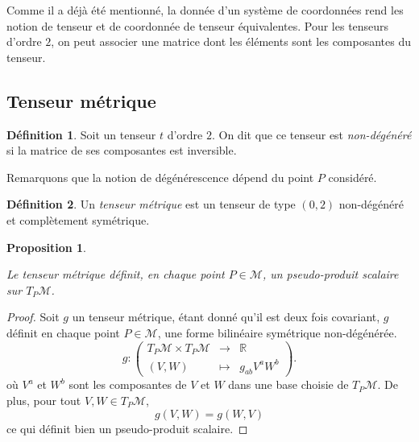 \documentclass[a4paper,11pt]{report}
\theoremstyle{definition}
\theoremstyle{plain}
\newtheorem{prop}[thm]{Proposition}
\theoremstyle{definition}
\newtheorem{defn}{Définition}[chapter]
\theoremstyle{remark}
\newcommand{\M}{\mathscr{M}}
\begin{document}
                Comme il a déjà été mentionné, la donnée d'un système de coordonnées rend les notion de tenseur et de coordonnée de tenseur équivalentes. Pour les tenseurs d'ordre $2$, on peut associer une matrice dont les éléments sont les composantes du tenseur.
                
            \subsection{Tenseur métrique}
                
                \begin{defn}
                    Soit un tenseur $t$ d'ordre $2$. On dit que ce tenseur est \textit{non-dégénéré} si la matrice de ses composantes est inversible.
                \end{defn}
                
                Remarquons que la notion de dégénérescence dépend du point $P$ considéré.
                
                \begin{defn}
                    Un \textit{tenseur métrique} est un tenseur de type $(0,2)$ non-dégénéré et complètement symétrique.
                \end{defn}
                
                \begin{prop}\begin{leftbar}
                    Le tenseur métrique définit, en chaque point $P\in\M$, un pseudo-produit scalaire sur $T_P\M$.
                \end{leftbar}\end{prop}
                
                \begin{proof}
                    Soit $g$ un tenseur métrique, étant donné qu'il est deux fois covariant, $g$ définit en chaque point $P\in\M$, une forme bilinéaire symétrique non-dégénérée.
                \begin{equation}
                    g:\left(
                \begin{array}{ccc}
                    T_P\M\times T_P\M & \longrightarrow & \mathbb{R} \\
                    (V,W) & \longmapsto & g_{ab}V^a W^b
                \end{array}
                \right).
                \end{equation}
                où $V^a$ et $W^b$ sont les composantes de $V$ et $W$ dans une base choisie de $T_P\M$. De plus, pour tout $V,W\in T_P\M$,
                \begin{equation}
                    g(V,W) = g(W,V)
                \end{equation}
                ce qui définit bien un pseudo-produit scalaire.
                \end{proof}
                
\end{document}
